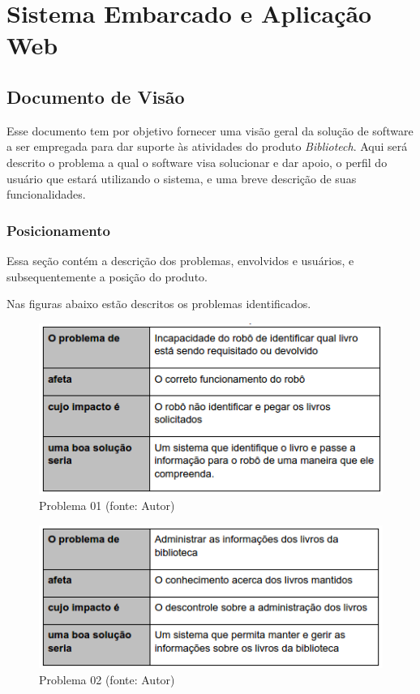 \section[Sistema Embarcado e Aplicação Web]{Sistema Embarcado e Aplicação Web}

\subsection{Documento de Visão}

Esse documento tem por objetivo fornecer uma visão geral da solução de software a ser empregada para dar suporte às atividades do produto \textit{Bibliotech}. Aqui será descrito o problema a qual o software visa solucionar e dar apoio, o perfil do usuário que estará utilizando o sistema, e uma breve descrição de suas funcionalidades.

\subsubsection{Posicionamento}
Essa seção contém a descrição dos problemas, envolvidos e usuários, e subsequentemente a posição do produto.


Nas figuras abaixo estão descritos os problemas identificados.

\begin{figure}[!h]
\centering
\includegraphics[scale=0.65, angle = 360]{figuras/descricao_problema1}
\caption[]{Problema 01 (fonte: Autor)}
\label{Problema 01}
\end{figure}
\FloatBarrier

\begin{figure}[!h]
\centering
\includegraphics[scale=0.65, angle = 360]{figuras/descricao_problema2}
\caption[]{Problema 02 (fonte: Autor)}
\label{Problema 02}
\end{figure}
\FloatBarrier

